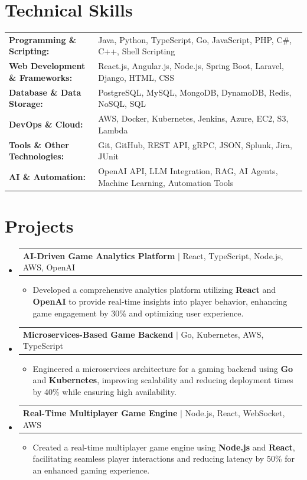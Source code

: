 \documentclass[letterpaper,10pt]{article}
\makeatletter
\newcommand{\resumeItem}[1]{
  \item{\fontsize{8pt}{9pt}\selectfont
    #1 \vspace{-3pt}
  }
}
\newcommand{\resumeProjectHeading}[2]{
    \item
    \begin{tabular*}{1.001\textwidth}{l@{\extracolsep{\fill}}r}
      \fontsize{8.5pt}{10pt}#1 & \textbf{\fontsize{8.5pt}{10pt} #2}\\
    \end{tabular*}\vspace{-7pt}
}
\newcommand{\resumeSubHeadingListStart}{\begin{itemize}[leftmargin=0pt, label={}]}
\newcommand{\resumeSubHeadingListEnd}{\end{itemize}}
\newcommand{\resumeItemListStart}{\begin{itemize}[leftmargin=*]}
\newcommand{\resumeItemListEnd}{\end{itemize}\vspace{-5pt}}
\makeatother
\begin{document}
\section{Technical Skills}
        \vspace{-14pt}
        \begin{table}[h]
            \fontsize{8pt}{9pt}\selectfont
            \begin{tabular}{p{0.3\linewidth} p{0.7\linewidth}}
                \textbf{Programming \& Scripting:} & Java, Python, TypeScript, Go, JavaScript, PHP, C\#, C++, Shell Scripting \\
                \textbf{Web Development \& Frameworks:} & React.js, Angular.js, Node.js, Spring Boot, Laravel, Django, HTML, CSS \\
                \textbf{Database \& Data Storage:} & PostgreSQL, MySQL, MongoDB, DynamoDB, Redis, NoSQL, SQL \\
                \textbf{DevOps \& Cloud:} & AWS, Docker, Kubernetes, Jenkins, Azure, EC2, S3, Lambda \\
                \textbf{Tools \& Other Technologies:} & Git, GitHub, REST API, gRPC, JSON, Splunk, Jira, JUnit \\
                \textbf{AI \& Automation:} & OpenAI API, LLM Integration, RAG, AI Agents, Machine Learning, Automation Tools \\
            \end{tabular}
        \end{table}
 \vspace{-18pt}

\section{Projects}
    \vspace{-5pt}
    \resumeSubHeadingListStart
          \resumeProjectHeading
            {\textbf{AI-Driven Game Analytics Platform} $|$ React, TypeScript, Node.js, AWS, OpenAI}{}
            \resumeItemListStart
                \resumeItem{Developed a comprehensive analytics platform utilizing \textbf{React} and \textbf{OpenAI} to provide real-time insights into player behavior, enhancing game engagement by 30\% and optimizing user experience.}
            \resumeItemListEnd
        \vspace{-12pt}
    
        \resumeProjectHeading
            {\textbf{Microservices-Based Game Backend} $|$ Go, Kubernetes, AWS, TypeScript}{}
        \resumeItemListStart
                \resumeItem{Engineered a microservices architecture for a gaming backend using \textbf{Go} and \textbf{Kubernetes}, improving scalability and reducing deployment times by 40\% while ensuring high availability.}
        \resumeItemListEnd
      \vspace{-12pt}
      \resumeProjectHeading
        {\textbf{Real-Time Multiplayer Game Engine} $|$ Node.js, React, WebSocket, AWS}{}
    \resumeItemListStart
            \resumeItem{Created a real-time multiplayer game engine using \textbf{Node.js} and \textbf{React}, facilitating seamless player interactions and reducing latency by 50\% for an enhanced gaming experience.}
    \resumeItemListEnd
    \resumeSubHeadingListEnd
\end{document}
